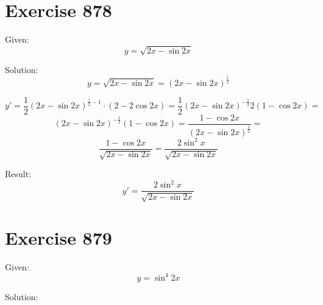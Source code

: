 \documentclass[a4paper, 10pt]{scrartcl}
\begin{document}
\section{Exercise 878}

Given:
\[
y = \sqrt{2x - \sin{2x}}
\]

Solution:
\[
y = \sqrt{2x - \sin{2x}} = (2x - \sin{2x})^{\frac{1}{2}}
\]

\[
y' = \frac{1}{2}(2x - \sin{2x})^{\frac{1}{2} - 1}\cdot(2 - 2\cos{2x}) = \frac{1}{2}(2x - \sin{2x})^{-\frac{1}{2}}2(1 - \cos{2x}) =
\]
\[
(2x - \sin{2x})^{-\frac{1}{2}}(1 - \cos{2x}) = \frac{1 - \cos{2x}}{(2x - \sin{2x})^{\frac{1}{2}}} =
\]
\[
\frac{1 - \cos{2x}}{\sqrt{2x - \sin{2x}}} = \frac{2\sin^{2}{x}}{\sqrt{2x - \sin{2x}}}
\]

Result:
\[
y' = \frac{2\sin^{2}{x}}{\sqrt{2x - \sin{2x}}}
\]

\section{Exercise 879}

Given:
\[
y = \sin^{4}{2x}
\]

Solution:
\end{document}
